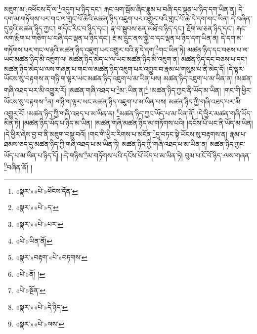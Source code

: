 མཇུག་མ་:འཕོངས་དོ་ལ་\footnote{«སྣར་»«པེ་»ཕོངས་དོན་}འདུག་པ་ཉིད་དང་། རྐང་ལག་སྦོམ་ཞིང་ཟླུམ་པ་བཞི་དང་ལྡན་པ་ཉིད་དག་ཡིན་ན། དེ་དག་མ་གཏོགས་པར་གང་ལ་གླང་པོ་ཆེའི་མཚན་ཉིད་འཇུག་པར་འགྱུར་བའི་གླང་པོ་ཆེ་དེ་དག་གང་ཡིན། དེ་བཞིན་དུ་རྟའི་མཚན་ཉིད་ཀྱང་། གདོང་རིང་བ་ཉིད་དང་། རྣ་བ་སྦུབས་ཅན་མཐོ་བ་ཉིད་དང་། རྔོག་མ་ཅན་ཉིད་དང་། རྐང་ལག་རྨིག་པ་གཅིག་པ་བཞི་དང་ལྡན་པ་ཉིད་དང་། རྔ་མ་དྲུང་ནས་སྐྱེ་བ་དང་ལྡན་པ་ཉིད་དག་ཡིན་ན། དེ་དག་མ་གཏོགས་པར་གང་ལ་རྟའི་མཚན་ཉིད་འཇུག་པར་འགྱུར་བའི་རྟ་དེ་དག་\footnote{«སྣར་»«པེ་»ད་}གང་ཡིན་ཏེ། མཚན་ཉིད་དང་བཅས་པ་ལ་ཡང་མཚན་ཉིད་མི་འཇུག་ལ། མཚན་ཉིད་མེད་པ་ལ་ཡང་མཚན་ཉིད་མི་འཇུག་ན། མཚན་ཉིད་དང་བཅས་པ་དང་། མཚན་ཉིད་མེད་པ་ལས་གཞན་པ་གང་ལ་མཚན་ཉིད་འཇུག་པར་འགྱུར་བ་རྣམ་པ་གསུམ་པ་ནི་མེད་དོ། །དེ་ལྟར་ཡོངས་སུ་བརྟགས་ན་གཉི་ག་ལྟར་ཡང་མཚན་ཉིད་འཇུག་པ་མ་ཡིན་པས། མཚན་ཉིད་འཇུག་པ་མ་ཡིན་ན། །མཚན་གཞི་འཐད་པར་མི་འགྱུར་རོ། །མཚན་གཞི་འཐད་པ་\footnote{«སྣར་»«པེ་»པར་}མ་:ཡིན་ན།\footnote{«པེ་»ཡིན་ནོ།} །མཚན་ཉིད་ཀྱང་ནི་ཡོད་མ་ཡིན། །གང་གི་ཕྱིར་ཡོངས་སུ་བརྟགས་\footnote{«སྣར་»བརྟག་«པེ་»བཏགས་}ན། གཉི་ག་ལྟར་ཡང་མཚན་ཉིད་འཇུག་པ་མ་ཡིན་པས། མཚན་ཉིད་ཀྱི་གཞི་འཐད་པར་མི་འགྱུར་རོ། །མཚན་ཉིད་ཀྱི་གཞི་འཐད་པ་མ་ཡིན་ན། \footnote{«པེ་»ནོ། ། }མཚན་ཉིད་ཀྱང་ཡོད་པ་མ་ཡིན་ནོ། །དེ་ཕྱིར་མཚན་གཞི་ཡོད་མིན་ཏེ། །མཚན་ཉིད་ཡོད་པ་ཉིད་མ་ཡིན། །མཚན་གཞི་མཚན་ཉིད་མ་གཏོགས་པའི། །དངོས་པོ་ཡང་ནི་ཡོད་མ་ཡིན། །དེ་ཕྱིར་ཞེས་བྱ་བ་ནི་མཇུག་བསྡུ་བའོ། །གང་གི་ཕྱིར་རིགས་པ་མངོན་\footnote{«པེ་»སྔོན་}དུ་བཏང་སྟེ་ཡོངས་སུ་བརྟགས་ན། རྣམ་པ་ཐམས་ཅད་དུ་མཚན་ཉིད་ཀྱི་གཞི་འཐད་པ་མ་ཡིན་ཏེ། མཚན་ཉིད་ཀྱི་གཞི་འཐད་པ་མ་ཡིན་ན། མཚན་ཉིད་ཀྱང་ཡོད་པ་མ་ཡིན་པ་ཉིད་དོ། །:དེ་གཉིས་\footnote{«སྣར་»«པེ་»དེ་ཉིད་}མ་གཏོགས་པའི་དངོས་པོ་ཡོད་པ་མ་ཡིན་ཏེ། བུམ་པ་ངོ་བོ་ཉིད་:ལས་གཞན་\footnote{«སྣར་»«པེ་»ལས་}བཞིན་ནོ། །
